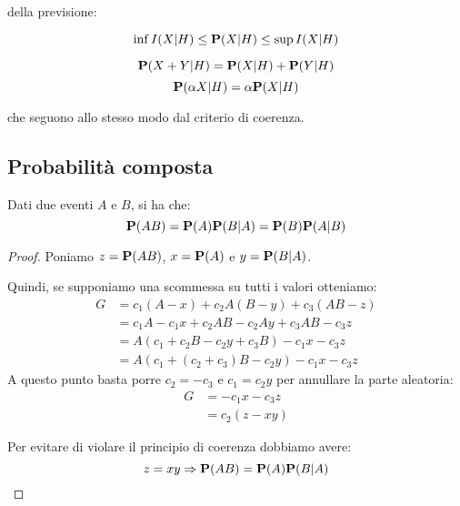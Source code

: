  della previsione:
\begin{definition}[Monotonia]\label{pro:monotonia_previsione_subordinata}
  \[ \inf I(X|H) \le \mathbf{P}(X|H) \le \sup I(X|H) \]
\end{definition}

\begin{definition}[Linearità]\label{pro:linearita_previsione_subordinata}
  \[ \mathbf{P}(X + Y|H) = \mathbf{P}(X|H) + \mathbf{P}(Y|H) \]
  \[ \mathbf{P}(\alpha X|H) = \alpha \mathbf{P}(X|H) \]
\end{definition}

che seguono allo stesso modo dal criterio di coerenza.


\subsection{Probabilità composta} %
\begin{theorem}\label{thm:probabilita_composta}
  Dati due eventi $A$ e $B$, si ha che:
  \[ \mathbf{P}(AB) = \mathbf{P}(A)\mathbf{P}(B|A) = \mathbf{P}(B)\mathbf{P}(A|B) \]
\end{theorem}

\begin{proof}
  Poniamo \( z = \mathbf{P}(AB) \), \( x = \mathbf{P}(A) \) e \( y = \mathbf{P}(B|A) \).

  Quindi, se supponiamo una scommessa su tutti i valori otteniamo:
  \begin{align*}
    G &= c_1 (A - x) + c_2 A (B - y) + c_3 (AB - z) \\
    &= c_1A - c_1 x + c_2 AB - c_2 Ay + c_3 AB - c_3 z \\
    &= A(c_1 + c_2 B - c_2 y + c_3 B) - c_1 x - c_3 z \\
    &= A(c_1 + (c_2 + c_3)B - c_2 y) - c_1 x - c_3 z
  \end{align*}
  A questo punto basta porre \( c_2 = - c_3 \) e \( c_1 = c_2 y \) per annullare la parte aleatoria:
  \begin{align*}
    G &= - c_1 x - c_3 z \\
    &= c_2 (z - xy)
  \end{align*}

  Per evitare di violare il principio di coerenza dobbiamo avere:
  \[ z = xy \Rightarrow \mathbf{P}(AB) = \mathbf{P}(A) \mathbf{P}(B|A) \]
\end{proof}

